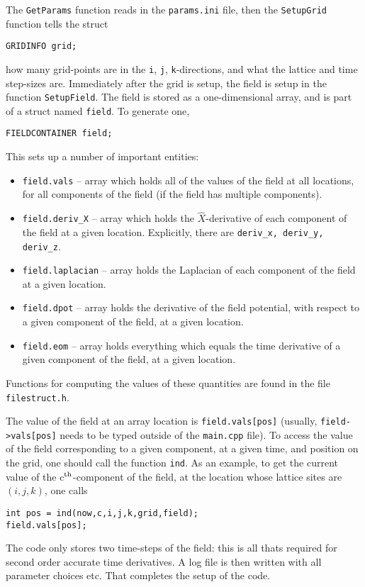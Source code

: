 \documentclass[amsmath,amssymb,12pt, eqsecnum]{revtex4}
\newcommand\codeRed[1]{\textcolor[rgb]{1,0,0}{{\tt #1}}}
\newcommand\codeBlue[1]{\textcolor[rgb]{0,0,1}{{\tt #1}}}
\begin{document}
The \codeBlue{GetParams} function reads in the {\tt params.ini} file, then the \codeBlue{SetupGrid} function tells the struct
\begin{verbatim}
GRIDINFO grid;
\end{verbatim}
how many grid-points are in the {\tt i}, {\tt j}, {\tt k}-directions, and what the lattice and time step-sizes are. Immediately after the grid is setup, the field is setup in the function \codeBlue{SetupField}. The  field  is stored as a one-dimensional array, and is part of a struct named {\tt field}. To generate one, 
\begin{verbatim}
FIELDCONTAINER field;
\end{verbatim}
This sets up a number of important entities:
\begin{itemize}
\item {\tt field.vals} --    array which holds all of the values of the field at all locations, for all components of the field (if the field has multiple components). 
\item {\tt field.deriv\_X} --    array which holds the $\hat{X}$-derivative of each component of the field at a given location. Explicitly, there are {\tt deriv\_x, deriv\_y, deriv\_z}.
\item {\tt field.laplacian} --   array holds the Laplacian of each component of the field at a given location.
\item {\tt field.dpot} --   array holds the derivative of the field potential, with respect to a given component of the field, at a given location.
\item {\tt field.eom} --   array holds everything which equals the time derivative of a given component of the field, at a given location.
\end{itemize}
Functions for computing the values of these quantities are found in the file \codeRed{filestruct.h}.

The value of the field at an array location is {\tt field.vals[pos]} (usually, {\tt field->vals[pos]} needs to be typed outside of the \codeRed{main.cpp} file). To access the value of the field corresponding to a given component, at a given time, and position on the grid, one should call the function {\tt ind}. As an example, to get the current value of the c${}^{\textrm{th}}$-component of the field, at the location whose lattice sites are $(i,j,k)$, one calls
\begin{verbatim}
int pos = ind(now,c,i,j,k,grid,field);
field.vals[pos];
\end{verbatim}
The code only stores two time-steps of the field: this is all thats required for second order accurate time derivatives.
A log file is then written with all parameter choices etc. That completes the setup of the code. 
\end{document}
